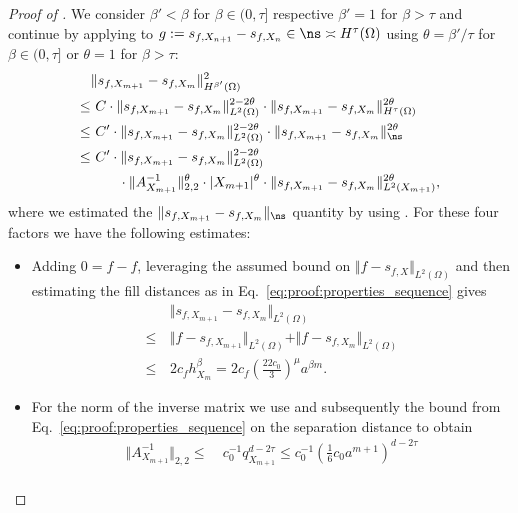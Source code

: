 \documentclass[a4paper, 10pt]{article}
\begin{document}
\begin{proof}[Proof of ]
%
We consider $\beta' < \beta$ for $\beta \in (0, \tau]$ respective $\beta'=1$ for $\beta > \tau$ and 
continue by applying  to $g := s_{f, X_{n+1}} - s_{f, X_n} \in \ns \asymp H^\tau(\Omega)$ using $\theta = \beta'/\tau$ for $\beta \in (0, \tau]$ or $\theta = 1$ for $\beta > \tau$:
%
\begin{align}
\begin{aligned}
\label{eq:application_hoelder}
&\Vert s_{f, X_{m+1}} - s_{f, X_{m}} \Vert_{H^{\beta'}(\Omega)}^2 \\
\leq& ~ C \cdot \Vert s_{f, X_{m+1}} - s_{f, X_{m}} \Vert_{L^2(\Omega)}^{2 - 2\theta} \cdot \Vert s_{f, X_{m+1}} - s_{f, X_{m}} \Vert_{H^\tau(\Omega)}^{2\theta} \\
\leq& ~ C' \cdot\Vert s_{f, X_{m+1}} - s_{f, X_{m}} \Vert_{L^2(\Omega)}^{2 - 2\theta} \cdot \Vert s_{f, X_{m+1}} - s_{f, X_{m}} \Vert_{\ns}^{2\theta} \\
\leq& ~ C' \cdot \Vert s_{f, X_{m+1}} - s_{f, X_{m}} \Vert_{L^2(\Omega)}^{2 - 2\theta} \\ 
&\qquad \cdot \Vert A_{X_{m+1}}^{-1} \Vert_{2,2}^{\theta} \cdot |X_{m+1}|^{\theta} \cdot \Vert s_{f, X_{m+1}} - s_{f, X_{m}} \Vert_{L^2(X_{m+1})}^{2\theta},
\end{aligned}
\end{align}
where we estimated the $\Vert s_{f, X_{m+1}} - s_{f, X_{m}} \Vert_{\ns}$ quantity by using .
%
%
%
For these four factors we have the following estimates:
%
\begin{itemize}
\item Adding $0 = f - f$, leveraging the assumed bound on $\Vert f - s_{f, X} \Vert_{L^2(\Omega)}$ and then estimating the fill distances as in Eq.\ \eqref{eq:proof:properties_sequence} gives
\begin{align*}
&\Vert s_{f, X_{m+1}} - s_{f, X_{m}} \Vert_{L^2(\Omega)} \\
\leq \, &\Vert f - s_{f, X_{m+1}} \Vert_{L^2(\Omega)} + \Vert f - s_{f, X_{m}} \Vert_{L^2(\Omega)} \\
\leq \, &2c_f h_{X_m}^{\beta} = 2c_f \left( \frac{22c_0}{3} \right)^\mu a^{\beta m}.
\end{align*}
\item For the norm of the inverse matrix we use  and subsequently the bound from Eq.\ \eqref{eq:proof:properties_sequence} on the separation distance to obtain
\begin{align*}
\Vert A_{X_{m+1}}^{-1} \Vert_{2,2} \leq& ~ c_0^{-1} q_{X_{m+1}}^{d-2\tau} \leq c_0^{-1} \left(\frac{1}{6} c_0 a^{m+1} \right)^{d-2\tau} \\

\end{align*}
\end{itemize}
\end{proof}
\end{document}
